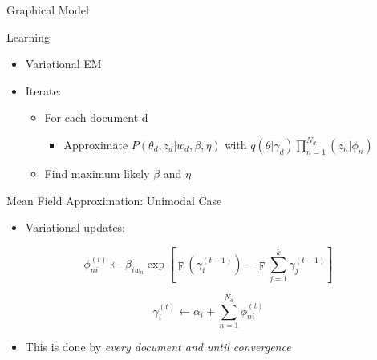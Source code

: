 \documentclass[pdf]{beamer}
\begin{document}
\begin{frame}{Graphical Model}
\end{frame}

\begin{frame}{Learning}
	\begin{itemize}
		\item Variational EM
		\item Iterate:
		\begin{itemize}
			\item For each document d
				\begin{itemize}
					\item Approximate $P(\theta_d, z_d|w_d, \beta, \eta)$ with $q(\theta|\gamma_d) \prod_{n=1}^{N_d}(z_n|\phi_n)$
				\end{itemize}
			\item Find maximum likely $\beta$ and $\eta$
		\end{itemize}
	\end{itemize}
\end{frame}

\begin{frame}{Mean Field Approximation: Unimodal Case}
	\begin{itemize}
		\item Variational updates:
	\end{itemize}
	\begin{equation*}
		\phi_{ni}^{(t)} \gets \beta_{i w_n} \exp\left[\digamma(\gamma_{i}^{(t-1)}) - \digamma{\sum_{j=1}^k \gamma_j^{(t-1)}}\right]
	\end{equation*}
	
	\begin{equation*}
		\gamma_i^{(t)}\gets \alpha_i + \sum_{n=1}^{N_d} \phi_{ni}^{(t)}
	\end{equation*}
	\begin{itemize}
		\item This is done by \textit{every document and until convergence}
	\end{itemize}

\end{frame}
\end{document}
